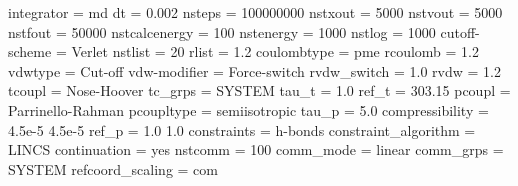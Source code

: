 \documentclass[
  letterpaper,
  DIV=11,
  numbers=noendperiod]{scrartcl}
\newenvironment{Shaded}{\begin{snugshade}}{\end{snugshade}}
\newcommand{\ExtensionTok}[1]{\textcolor[rgb]{0.00,0.46,0.62}{#1}}
\newcommand{\NormalTok}[1]{\textcolor[rgb]{0.00,0.46,0.62}{#1}}
\begin{document}
\begin{Shaded}
\begin{Highlighting}[]
\ExtensionTok{integrator}\NormalTok{              = md}
\ExtensionTok{dt}\NormalTok{                      = 0.002}
\ExtensionTok{nsteps}\NormalTok{                  = 100000000}
\ExtensionTok{nstxout}\NormalTok{                 = 5000}
\ExtensionTok{nstvout}\NormalTok{                 = 5000}
\ExtensionTok{nstfout}\NormalTok{                 = 50000}
\ExtensionTok{nstcalcenergy}\NormalTok{           = 100}
\ExtensionTok{nstenergy}\NormalTok{               = 1000}
\ExtensionTok{nstlog}\NormalTok{                  = 1000}
\ExtensionTok{cutoff{-}scheme}\NormalTok{           = Verlet}
\ExtensionTok{nstlist}\NormalTok{                 = 20}
\ExtensionTok{rlist}\NormalTok{                   = 1.2}
\ExtensionTok{coulombtype}\NormalTok{             = pme}
\ExtensionTok{rcoulomb}\NormalTok{                = 1.2}
\ExtensionTok{vdwtype}\NormalTok{                 = Cut{-}off}
\ExtensionTok{vdw{-}modifier}\NormalTok{            = Force{-}switch}
\ExtensionTok{rvdw\_switch}\NormalTok{             = 1.0}
\ExtensionTok{rvdw}\NormalTok{                    = 1.2}
\ExtensionTok{tcoupl}\NormalTok{                  = Nose{-}Hoover}
\ExtensionTok{tc\_grps}\NormalTok{                 = SYSTEM}
\ExtensionTok{tau\_t}\NormalTok{                   = 1.0}
\ExtensionTok{ref\_t}\NormalTok{                   = 303.15}
\ExtensionTok{pcoupl}\NormalTok{                  = Parrinello{-}Rahman}
\ExtensionTok{pcoupltype}\NormalTok{              = semiisotropic}
\ExtensionTok{tau\_p}\NormalTok{                   = 5.0}
\ExtensionTok{compressibility}\NormalTok{         = 4.5e{-}5  4.5e{-}5}
\ExtensionTok{ref\_p}\NormalTok{                   = 1.0     1.0}
\ExtensionTok{constraints}\NormalTok{             = h{-}bonds}
\ExtensionTok{constraint\_algorithm}\NormalTok{    = LINCS}
\ExtensionTok{continuation}\NormalTok{            = yes}
\ExtensionTok{nstcomm}\NormalTok{                 = 100}
\ExtensionTok{comm\_mode}\NormalTok{               = linear}
\ExtensionTok{comm\_grps}\NormalTok{               = SYSTEM}
\ExtensionTok{refcoord\_scaling}\NormalTok{        = com}
\end{Highlighting}
\end{Shaded}
\end{document}
